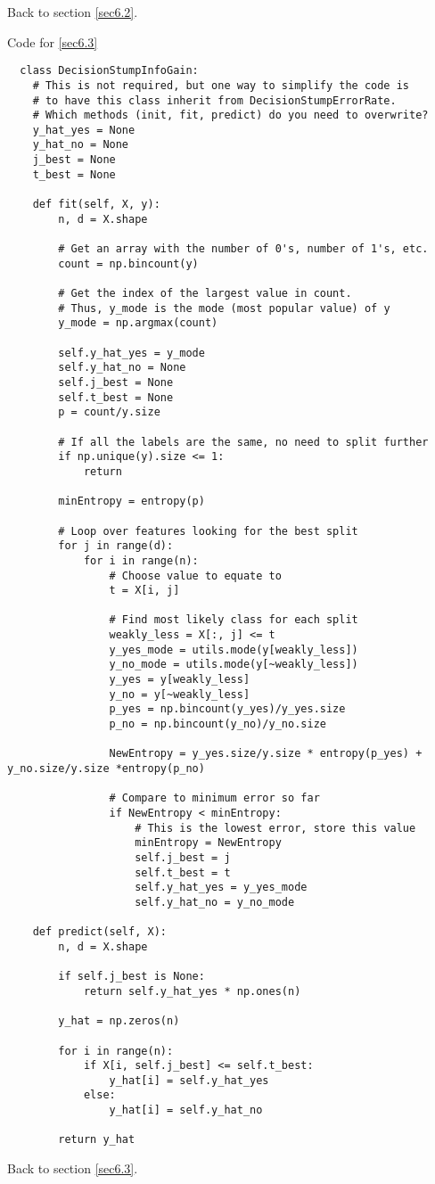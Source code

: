\documentclass{article}
\begin{document}
Back to section \ref{sec6.2}.

\clearpage
Code for \ref{sec6.3}
\label{code6.3}\begin{verbatim} 
  class DecisionStumpInfoGain:
    # This is not required, but one way to simplify the code is
    # to have this class inherit from DecisionStumpErrorRate.
    # Which methods (init, fit, predict) do you need to overwrite?
    y_hat_yes = None
    y_hat_no = None
    j_best = None
    t_best = None

    def fit(self, X, y):
        n, d = X.shape

        # Get an array with the number of 0's, number of 1's, etc.
        count = np.bincount(y)

        # Get the index of the largest value in count.
        # Thus, y_mode is the mode (most popular value) of y
        y_mode = np.argmax(count)

        self.y_hat_yes = y_mode
        self.y_hat_no = None
        self.j_best = None
        self.t_best = None
        p = count/y.size

        # If all the labels are the same, no need to split further
        if np.unique(y).size <= 1:
            return

        minEntropy = entropy(p)

        # Loop over features looking for the best split
        for j in range(d):
            for i in range(n):
                # Choose value to equate to
                t = X[i, j]

                # Find most likely class for each split
                weakly_less = X[:, j] <= t
                y_yes_mode = utils.mode(y[weakly_less])
                y_no_mode = utils.mode(y[~weakly_less])
                y_yes = y[weakly_less]
                y_no = y[~weakly_less] 
                p_yes = np.bincount(y_yes)/y_yes.size
                p_no = np.bincount(y_no)/y_no.size

                NewEntropy = y_yes.size/y.size * entropy(p_yes) + y_no.size/y.size *entropy(p_no)

                # Compare to minimum error so far
                if NewEntropy < minEntropy:
                    # This is the lowest error, store this value
                    minEntropy = NewEntropy
                    self.j_best = j
                    self.t_best = t
                    self.y_hat_yes = y_yes_mode
                    self.y_hat_no = y_no_mode

    def predict(self, X):
        n, d = X.shape

        if self.j_best is None:
            return self.y_hat_yes * np.ones(n)

        y_hat = np.zeros(n)

        for i in range(n):
            if X[i, self.j_best] <= self.t_best:
                y_hat[i] = self.y_hat_yes
            else:
                y_hat[i] = self.y_hat_no

        return y_hat
  \end{verbatim}
Back to section \ref{sec6.3}.
\end{document}
